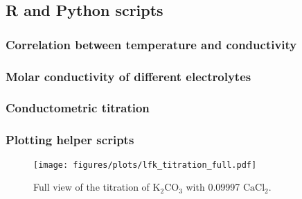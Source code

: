 \subsection{R and Python scripts} \label{r_scripts}

\subsubsection{Correlation between temperature and conductivity}

\newpage
\subsubsection{Molar conductivity of different electrolytes}

\newpage
\subsubsection{Conductometric titration}

\newpage
\subsubsection{Plotting helper scripts}

\begin{figure}[H]
    \centering
    \texttt{[image: figures/plots/lfk\_titration\_full.pdf]}
    \caption{Full view of the titration of $\mathrm{K_{2}CO_{3}}$ with \qty[round-precision=5]{0.09997}{\M} $\mathrm{CaCl_2}$.}
    \label{fig:lfk_titr_full}
\end{figure}

 
 \label{append:LFK_water_and_molar}


